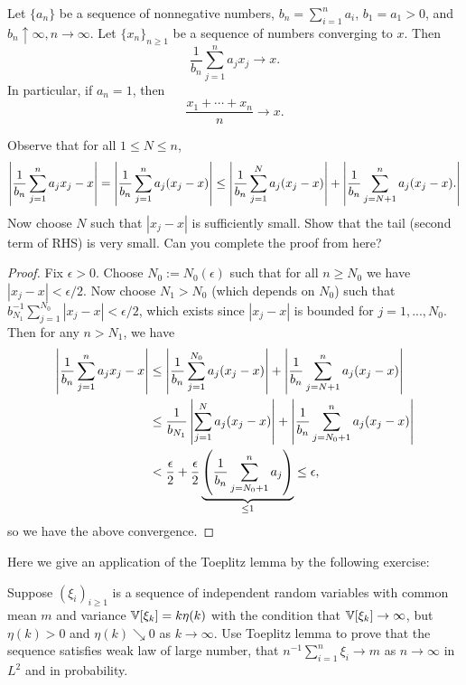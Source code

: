 \begin{lemma}[Toeplitz] \label{lem:Toeplitz}
Let $\{a_n\}$ be a sequence of nonnegative numbers, $b_n = \sum_{i=1}^n a_i$, $b_1 = a_1 > 0$, and $b_n \uparrow \infty, n \to \infty$. Let $\{ x_n \}_{n \ge 1}$ be a sequence of numbers converging to $x$. Then
\begin{equation*}
    \frac{1}{b_n} \sum_{j=1}^n a_j x_j \to x.
\end{equation*}
In particular, if $a_n = 1$, then
\begin{equation*}
    \frac{x_1 + \cdots + x_n}{n} \to x.
\end{equation*}
\end{lemma}

\begin{hint}
Observe that for all $1 \leq N \leq n$,
\begin{equation*}
\left| \frac{1}{b_n}\sum_{j=1}^n a_j x_j - x \right| = \left| \frac{1}{b_n}\sum_{j=1}^n a_j(x_j - x) \right| \leq \left| \frac{1}{b_n}\sum_{j=1}^N a_j(x_j - x) \right| + \left| \frac{1}{b_n}\sum_{j=N+1}^n a_j(x_j - x). \right|
\end{equation*}
Now choose $N$ such that $|x_j - x|$ is sufficiently small. Show that the tail (second term of RHS) is very small. Can you complete the proof from here?
\end{hint}

\begin{proof}
Fix $\epsilon > 0$. Choose $N_0 := N_0(\epsilon)$ such that for all $n \geq N_0$ we have $|x_j - x| < \epsilon/2$. Now choose $N_1 > N_0$ (which depends on $N_0$) such that $b_{N_1}^{-1} \sum_{j=1}^{N_0} |x_j - x| < \epsilon/2$, which exists since $|x_j - x|$ is bounded for $j = 1,...,N_0$. Then for any $n > N_1$, we have
\begin{align*}
\left| \frac{1}{b_n}\sum_{j=1}^n a_j x_j - x \right| &\leq \left| \frac{1}{b_n}\sum_{j=1}^{N_0} a_j(x_j - x) \right| + \left| \frac{1}{b_n}\sum_{j=N+1}^n a_j(x_j - x) \right| \\
&\leq \frac{1}{b_{N_1}} \left| \sum_{j=1}^N a_j(x_j - x) \right| + \left| \frac{1}{b_n}\sum_{j={N_0}+1}^n a_j(x_j - x) \right|\\
&< \frac{\epsilon}{2} + \frac{\epsilon}{2} \underbrace{\left( \frac{1}{b_n} \sum_{j=N_0+1}^n a_j \right)}_{\leq 1} \leq \epsilon,
\end{align*}
so we have the above convergence.
\end{proof}

Here we give an application of the Toeplitz lemma by the following exercise:
\begin{exercise}
Suppose $(\xi_i)_{i\geq 1}$ is a sequence of independent random variables with common mean $m$ and variance $\mathbb{V}[\xi_k] = k\eta(k)$ with the condition that $\mathbb{V}[\xi_k] \to \infty$, but $\eta(k) > 0$ and $\eta(k) \searrow 0$ as $k \to \infty$. Use Toeplitz lemma to prove that the sequence satisfies weak law of large number, that $n^{-1} \sum_{i=1}^n \xi_i \to m$ as $n \to \infty$ in $L^2$ and in probability.
\end{exercise}

